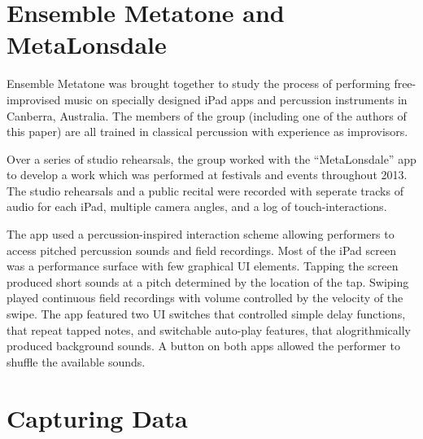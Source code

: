 \documentclass{chi-ext}
\begin{document}
\section{Ensemble Metatone and MetaLonsdale}

Ensemble Metatone was brought together to study the process of
performing free-improvised music on specially designed iPad apps and
percussion instruments in Canberra, Australia. The members of the group (including
one of the authors of this paper) are all trained in classical
percussion with experience as improvisors.

Over a series of studio rehearsals, the group worked with the
``MetaLonsdale'' app to develop a work which was performed at
festivals and events throughout 2013. The studio rehearsals and a public recital were
recorded with seperate tracks of audio for each iPad, multiple camera angles, and a log of touch-interactions.

The app used a percussion-inspired interaction scheme allowing
performers to access pitched percussion sounds and field recordings.
Most of the iPad screen was a performance surface with few graphical
UI elements. Tapping the screen produced short sounds at a pitch
determined by the location of the tap. Swiping played continuous field
recordings with volume controlled by the velocity of the swipe. The
app featured two UI switches that controlled simple delay functions, that repeat tapped notes, and
switchable auto-play features, that alogrithmically produced
background sounds. A button on both apps allowed the performer to shuffle
the available sounds.


\section{Capturing Data}
\end{document}
